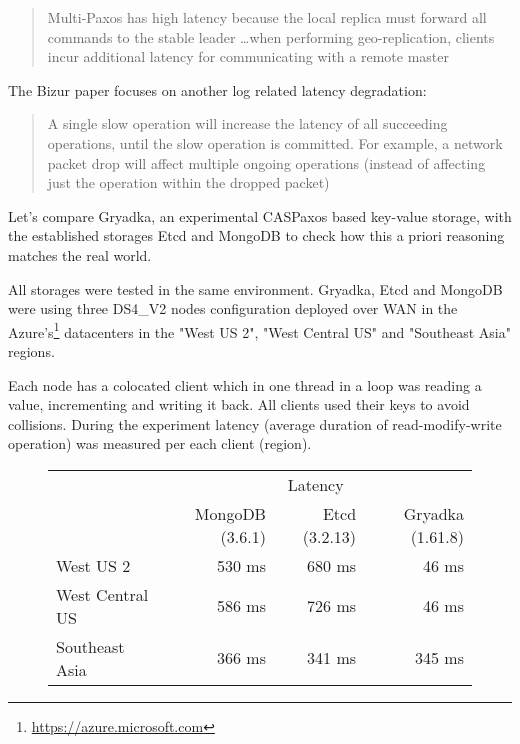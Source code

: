 \documentclass[12pt]{article}
\theoremstyle{definition}
\begin{document}
\begin{quote}
Multi-Paxos has high latency because the local replica must forward all commands to the stable leader \ldots when performing geo-replication, clients incur additional latency for communicating with a remote master
\end{quote}

The Bizur paper focuses on another log related latency degradation:

\begin{quote}
A single slow operation will increase the latency of all succeeding operations, until the slow operation is committed. For example, a network packet drop will affect multiple ongoing operations (instead of affecting just the operation within the dropped packet)
\end{quote}

Let's compare Gryadka, an experimental CASPaxos based key-value storage, with the established storages Etcd and MongoDB to check how this a priori reasoning matches the real world.

All storages were tested in the same environment. Gryadka, Etcd and MongoDB were using three DS4\_V2 nodes configuration deployed over WAN in the Azure's\footnote{\href{https://azure.microsoft.com}{https://azure.microsoft.com}} datacenters in the "West US 2", "West Central US" and "Southeast Asia" regions.

Each node has a colocated client which in one thread in a loop was reading a value, incrementing and writing it back. All clients used their keys to avoid collisions. During the experiment latency (average duration of read-modify-write operation) was measured per each client (region).

\begin{figure}[!htb]
  \centering
  \begin{tabular}{c|r|r|r|}
  \cline{2-4}
  & \multicolumn{3}{|c|}{Latency} \\
  \cline{2-4}
  & MongoDB (3.6.1) & Etcd (3.2.13) & Gryadka (1.61.8) \\
  \hline
  \multicolumn{1}{|l|}{West US 2} & 530 ms & 680 ms & 46 ms \\
  \hline
  \multicolumn{1}{|l|}{West Central US} & 586 ms & 726 ms & 46 ms \\
  \hline
  \multicolumn{1}{|l|}{Southeast Asia} & 366 ms & 341 ms & 345 ms \\
  \hline
  \end{tabular}
\end{figure}
\end{document}
